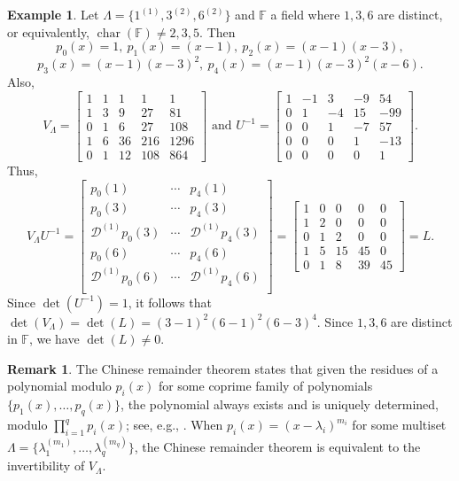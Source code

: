 \documentclass{article}
\theoremstyle{definition}
\newtheorem{remark}[theorem]{Remark}
\newtheorem{example}[theorem]{Example}
\newcommand{\fchar}{\operatorname{char}}
\begin{document}
\begin{example} 
Let $\Lambda = \{1^{(1)},3^{(2)},6^{(2)}\}$ and $\mathbb{F}$ a field where $1,3,6$ are distinct, or equivalently, $\fchar(\mathbb{F}) \neq 2,3,5$.  Then 
\[
    p_0(x) = 1,\ p_1(x) = (x - 1),\ p_2(x) = (x - 1)(x - 3), 
\]
\[
    p_3(x) = (x - 1)(x - 3)^2,\ p_4(x) = (x - 1)(x - 3)^2(x - 6). 
\]
Also,  
\[
    V_\Lambda = \begin{bmatrix}
        1 & 1 & 1 & 1 & 1 \\
        1 & 3 & 9 & 27 & 81 \\
        0 & 1 & 6 & 27 & 108 \\
        1 & 6 & 36 & 216 & 1296 \\
        0 & 1 & 12 & 108 & 864
    \end{bmatrix} \text{ and }
    U^{-1} = \begin{bmatrix}
        1 & -1 & 3 & -9 & 54 \\
        0 & 1 & -4 & 15 & -99 \\
        0 & 0 & 1 & -7 & 57 \\
        0 & 0 & 0 & 1 & -13 \\
        0 & 0 & 0 & 0 & 1
    \end{bmatrix}.
\]
Thus, 
\[
    V_\Lambda U^{-1} = \begin{bmatrix}
        p_0(1) & \cdots & p_4(1) \\
        p_0(3) & \cdots & p_4(3) \\
        \mathcal{D}^{(1)}p_0(3) & \cdots & \mathcal{D}^{(1)}p_4(3) \\
        p_0(6) & \cdots & p_4(6) \\
        \mathcal{D}^{(1)}p_0(6) & \cdots & \mathcal{D}^{(1)}p_4(6) \\
    \end{bmatrix} =
    \begin{bmatrix}
        1 & 0 & 0 & 0 & 0 \\
        1 & 2 & 0 & 0 & 0 \\
        0 & 1 & 2 & 0 & 0 \\
        1 & 5 & 15 & 45 & 0 \\
        0 & 1 & 8 & 39 & 45
    \end{bmatrix} = L.
\]
Since $\det(U^{-1}) = 1$, it follows that $\det(V_\Lambda) = \det(L) 
= (3 - 1)^2 (6 - 1)^2 (6 - 3)^4$.  
Since $1,3,6$ are distinct in $\mathbb{F}$, we have $\det(L) \neq 0$.  
\end{example}

\begin{remark}
The Chinese remainder theorem states that given the residues of a polynomial modulo $p_i(x)$ for some coprime family of polynomials $\{p_1(x), \ldots, p_q(x)\}$, the polynomial always exists and is uniquely determined, modulo $\prod_{i=1}^q p_i(x)$; see, e.g., \cite{Shoup08}.  When $p_i(x) = (x - \lambda_i)^{m_i}$ for some multiset $\Lambda = \{\lambda_1^{(m_1)}, \ldots, \lambda_q^{(m_q)}\}$, the Chinese remainder theorem is equivalent to the invertibility of $V_\Lambda$.
\end{remark}
\end{document}
